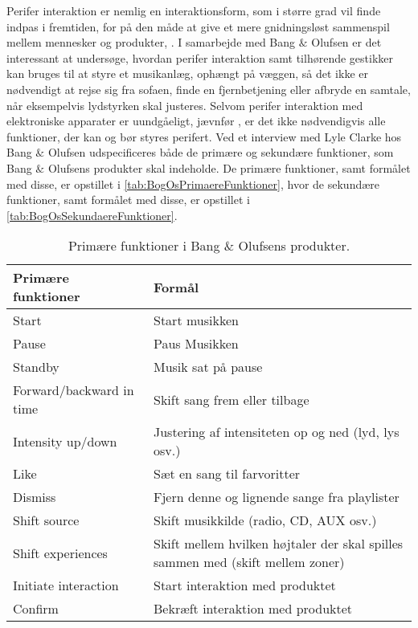 Perifer interaktion er nemlig en interaktionsform, som i større grad vil finde indpas i fremtiden, for på den måde at give et mere gnidningsløst sammenspil mellem mennesker og produkter, \parencite[s. 1]{PDF:PIIntroduction}. I samarbejde med Bang $\&$ Olufsen er det interessant at undersøge, hvordan perifer interaktion samt tilhørende gestikker kan bruges til at styre et musikanlæg, ophængt på væggen, så det ikke er nødvendigt at rejse sig fra sofaen, finde en fjernbetjening eller afbryde en samtale, når eksempelvis lydstyrken skal justeres. Selvom perifer interaktion med elektroniske apparater er uundgåeligt, jævnfør \textcite[s. 1]{PDF:PIIntroduction}, er det ikke nødvendigvis alle funktioner, der kan og bør styres perifert. Ved et interview med Lyle Clarke hos Bang $\&$ Olufsen udspecificeres både de primære og sekundære funktioner, som Bang $\&$ Olufsens produkter skal indeholde. De primære funktioner, samt formålet med disse, er opstillet i \autoref{tab:BogOsPrimaereFunktioner}, hvor de sekundære funktioner, samt formålet med disse, er opstillet i \autoref{tab:BogOsSekundaereFunktioner}.
%
\begin{table}[H]
	\centering
	\begin{tabular}{ | l | p{8cm} |}
		\hline
		\multicolumn{1}{|l|}{\textbf{Primære funktioner}} & \multicolumn{1}{l|}{\textbf{Formål}} \\ \hline
		Start & Start musikken \\ \hline
		Pause & Paus Musikken \\ \hline
		Standby & Musik sat på pause \\ \hline
		Forward/backward in time & Skift sang frem eller tilbage \\ \hline
		Intensity up/down & Justering af intensiteten op og ned (lyd, lys osv.) \\ \hline
		Like & Sæt en sang til farvoritter \\ \hline
		Dismiss & Fjern denne og lignende sange fra playlister \\ \hline
		Shift source & Skift musikkilde (radio, CD, AUX osv.) \\ \hline
		Shift experiences & Skift mellem hvilken højtaler der skal spilles sammen med (skift mellem zoner) \\ \hline
		Initiate interaction & Start interaktion med produktet \\ \hline
		Confirm & Bekræft interaktion med produktet \\ \hline
	\end{tabular}
	\caption{Primære funktioner i Bang $\&$ Olufsens produkter.}
	\label{tab:BogOsPrimaereFunktioner}
\end{table}
